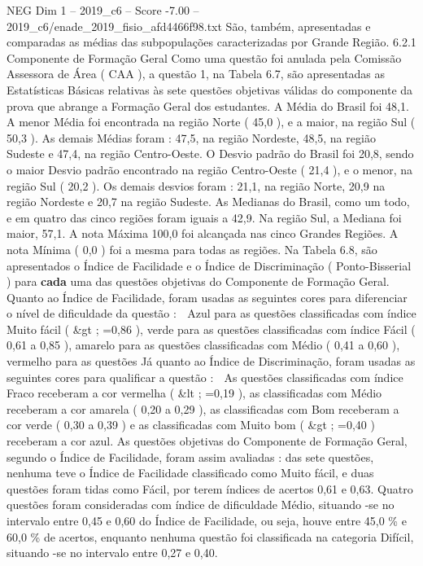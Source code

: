 \begin{textsample}{NEG Dim 1 – 2019\_c6 – Score -7.00 – 2019\_c6/enade\_2019\_fisio\_afd4466f98.txt}
São, também, apresentadas e comparadas as médias das subpopulações caracterizadas por Grande Região. 6.2.1 Componente de Formação Geral Como uma questão foi anulada pela Comissão Assessora de Área ( CAA ), a questão 1, na Tabela 6.7, são apresentadas as Estatísticas Básicas relativas às sete questões objetivas válidas do componente da prova que abrange a Formação Geral dos estudantes.
A Média do Brasil foi 48,1.
A menor Média foi encontrada na região Norte ( 45,0 ), e a maior, na região Sul ( 50,3 ).
As demais Médias foram : 47,5, na região Nordeste, 48,5, na região Sudeste e 47,4, na região Centro-Oeste.
O Desvio padrão do Brasil foi 20,8, sendo o maior Desvio padrão encontrado na região Centro-Oeste ( 21,4 ), e o menor, na região Sul ( 20,2 ).
Os demais desvios foram : 21,1, na região Norte, 20,9 na região Nordeste e 20,7 na região Sudeste.
As Medianas do Brasil, como um todo, e em quatro das cinco regiões foram iguais a 42,9.
Na região Sul, a Mediana foi maior, 57,1.
A nota Máxima 100,0 foi alcançada nas cinco Grandes Regiões.
A nota Mínima ( 0,0 ) foi a mesma para todas as regiões.
Na Tabela 6.8, são apresentados o Índice de Facilidade e o Índice de Discriminação ( Ponto-Bisserial ) para \textbf{cada} uma das questões objetivas do Componente de Formação Geral.
Quanto ao Índice de Facilidade, foram usadas as seguintes cores para diferenciar o nível de dificuldade da questão :  Azul para as questões classificadas com índice Muito fácil ( \&gt ; =0,86 ), verde para as questões classificadas com índice Fácil ( 0,61 a 0,85 ), amarelo para as questões classificadas com Médio ( 0,41 a 0,60 ), vermelho para as questões Já quanto ao Índice de Discriminação, foram usadas as seguintes cores para qualificar a questão :  As questões classificadas com índice Fraco receberam a cor vermelha ( \&lt ; =0,19 ), as classificadas com Médio receberam a cor amarela ( 0,20 a 0,29 ), as classificadas com Bom receberam a cor verde ( 0,30 a 0,39 ) e as classificadas com Muito bom ( \&gt ; =0,40 ) receberam a cor azul.
As questões objetivas do Componente de Formação Geral, segundo o Índice de Facilidade, foram assim avaliadas : das sete questões, nenhuma teve o Índice de Facilidade classificado como Muito fácil, e duas questões foram tidas como Fácil, por terem índices de acertos 0,61 e 0,63.
Quatro questões foram consideradas com índice de dificuldade Médio, situando -se no intervalo entre 0,45 e 0,60 do Índice de Facilidade, ou seja, houve entre 45,0 \% e 60,0 \% de acertos, enquanto nenhuma questão foi classificada na categoria Difícil, situando -se no intervalo entre 0,27 e 0,40.

\end{textsample}
